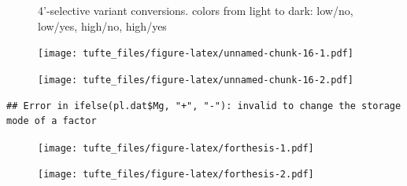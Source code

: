 \documentclass[]{tufte-handout}
\begin{document}
\begin{figure}
\caption{4'-selective variant conversions. colors from light to dark: low/no, low/yes, high/no, high/yes}
\end{figure}

\begin{figure}
 \texttt{[image: tufte\_files/figure-latex/unnamed-chunk-16-1.pdf]}
\end{figure}\begin{figure}
 \texttt{[image: tufte\_files/figure-latex/unnamed-chunk-16-2.pdf]}
\end{figure}

\begin{verbatim}
## Error in ifelse(pl.dat$Mg, "+", "-"): invalid to change the storage mode of a factor
\end{verbatim}

\begin{figure}
 \texttt{[image: tufte\_files/figure-latex/forthesis-1.pdf]}
\end{figure}\begin{figure}
 \texttt{[image: tufte\_files/figure-latex/forthesis-2.pdf]}
\end{figure}
\end{document}
